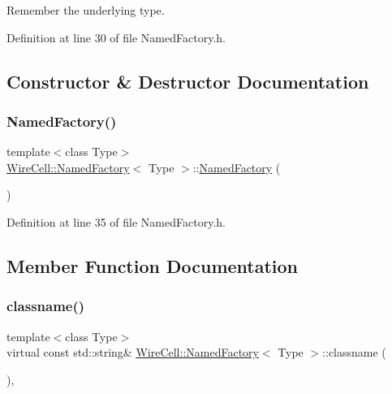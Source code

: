 Remember the underlying type. 



Definition at line 30 of file Named\+Factory.\+h.



\subsection{Constructor \& Destructor Documentation}
\mbox{\label{class_wire_cell_1_1_named_factory_a65b66a089f29b519d4d0146a065a9754}} 
\subsubsection{\texorpdfstring{Named\+Factory()}{NamedFactory()}}
{\footnotesize\ttfamily template$<$class Type$>$ \\
\hyperlink{class_wire_cell_1_1_named_factory}{Wire\+Cell\+::\+Named\+Factory}$<$ Type $>$\+::\hyperlink{class_wire_cell_1_1_named_factory}{Named\+Factory} (\begin{DoxyParamCaption}{ }\end{DoxyParamCaption})\hspace{0.3cm}{\ttfamily [inline]}}



Definition at line 35 of file Named\+Factory.\+h.



\subsection{Member Function Documentation}
\mbox{\label{class_wire_cell_1_1_named_factory_a55b839d7786ecca7b85bcabb7c163daa}} 
\subsubsection{\texorpdfstring{classname()}{classname()}}
{\footnotesize\ttfamily template$<$class Type$>$ \\
virtual const std\+::string\& \hyperlink{class_wire_cell_1_1_named_factory}{Wire\+Cell\+::\+Named\+Factory}$<$ Type $>$\+::classname (\begin{DoxyParamCaption}{ }\end{DoxyParamCaption})\hspace{0.3cm}{\ttfamily [inline]}, {\ttfamily [virtual]}}



